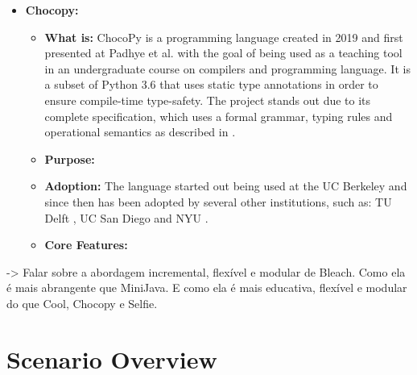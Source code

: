 \begin{itemize}
    \item \textbf{Chocopy:}
    \begin{itemize}
        \item \textbf{What is:} ChocoPy is a programming language created in 2019 and first presented at Padhye et al. \cite{padhye2019chocopy} with the goal of being used as a teaching tool in an undergraduate course on compilers and programming language. It is a subset of Python 3.6 that uses static type annotations in order to ensure compile-time type-safety. 
        The project stands out due to its complete specification, which uses a formal grammar, typing rules and operational semantics as described in \cite{padhye2019chocopy}.
        \item \textbf{Purpose:}
        \item \textbf{Adoption:} The language started out being used at the UC Berkeley and since then has been adopted by several other institutions, such as: TU Delft \cite{}, UC San Diego{} and NYU \cite{}. 
        \item \textbf{Core Features:}
    \end{itemize}
    
\end{itemize}

-> Falar sobre a abordagem incremental, flexível e modular de Bleach. Como ela é mais abrangente que MiniJava. E como ela é mais educativa, flexível e modular do que Cool, Chocopy e Selfie.

\section{Scenario Overview}
